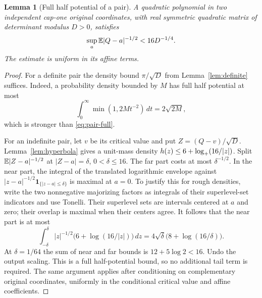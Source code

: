 \documentclass[11pt]{article}
\numberwithin{equation}{section}
\newtheorem{lemma}[theorem]{Lemma}
\theoremstyle{definition}\newtheorem{definition}[theorem]{Definition}
\theoremstyle{remark}\newtheorem{remark}[theorem]{Remark}
\newcommand{\1}{\mathbf 1}\newcommand{\diag}{\operatorname{diag}}
\begin{document}
\begin{lemma}[Full half potential of a pair]\label{lem:pair-full}
A quadratic polynomial in two independent cap-one original coordinates, with real symmetric quadratic matrix of determinant modulus $D>0$, satisfies
\begin{equation}\label{eq:pair-full}
 \sup_a\mathbb E|Q-a|^{-1/2}<16D^{-1/4}.
\end{equation}
The estimate is uniform in its affine terms.
\end{lemma}
\begin{proof}
For a definite pair the density bound $\pi/\sqrt D$ from Lemma~\ref{lem:definite} suffices. Indeed, a probability density bounded by $M$ has full half potential at most
\[
 \int_0^\infty\min(1,2Mt^{-2})\,dt=2\sqrt{2M},
\]
which is stronger than \eqref{eq:pair-full}.

For an indefinite pair, let $v$ be its critical value and put $Z=(Q-v)/\sqrt D$. Lemma~\ref{lem:hyperbola} gives a unit-mass density $h(z)\le6+\log_+(16/|z|)$. Split $\mathbb E|Z-a|^{-1/2}$ at $|Z-a|=\delta$, $0<\delta\le16$. The far part costs at most $\delta^{-1/2}$. In the near part, the integral of the translated logarithmic envelope against $|z-a|^{-1/2}\1_{\{|z-a|\le\delta\}}$ is maximal at $a=0$. To justify this for rough densities, write the two nonnegative majorizing factors as integrals of their superlevel-set indicators and use Tonelli. Their superlevel sets are intervals centered at $a$ and zero; their overlap is maximal when their centers agree. It follows that the near part is at most
\[
 \int_{-\delta}^{\delta}|z|^{-1/2}\bigl(6+\log(16/|z|)\bigr)\,dz
 =4\sqrt\delta\bigl(8+\log(16/\delta)\bigr).
\]
At $\delta=1/64$ the sum of near and far bounds is $12+5\log2<16$. Undo the output scaling. This is a full half-potential bound, so no additional tail term is required. The same argument applies after conditioning on complementary original coordinates, uniformly in the conditional critical value and affine coefficients.
\end{proof}
\end{document}
